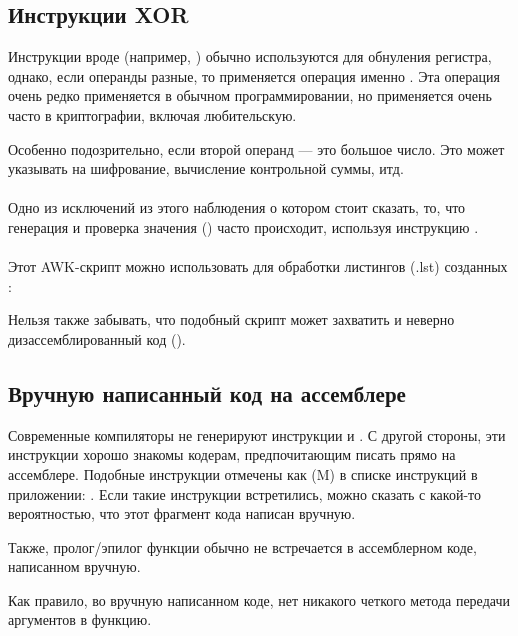 
\subsection{Инструкции XOR}

Инструкции вроде  (например, ) 
обычно используются для обнуления регистра,
однако, если операнды разные, то применяется операция именно .
Эта операция очень редко применяется в обычном программировании, но применяется очень часто в криптографии,
включая любительскую.

Особенно подозрительно, если второй операнд --- это большое число.
Это может указывать на шифрование, вычисление контрольной суммы, итд.  \\
\\
Одно из исключений из этого наблюдения о котором стоит сказать, то, что генерация и проверка значения 
() часто происходит, используя инструкцию \XOR.  \\
\\
Этот AWK-скрипт можно использовать для обработки листингов (.lst) созданных \IDA{}:



Нельзя также забывать, что подобный скрипт может захватить и неверно дизассемблированный код 
().

\subsection{Вручную написанный код на ассемблере}

Современные компиляторы не генерируют инструкции  и . 
С другой стороны, эти инструкции хорошо знакомы кодерам, предпочитающим писать прямо на ассемблере. 
Подобные инструкции отмечены как (M) в списке инструкций в приложении: 
.
Если такие инструкции встретились, можно сказать с какой-то вероятностью, что этот фрагмент кода написан вручную.

\par
Также, пролог/эпилог функции обычно не встречается в ассемблерном коде, написанном вручную.

\par
Как правило, во вручную написанном коде, нет никакого четкого метода передачи аргументов в функцию.


